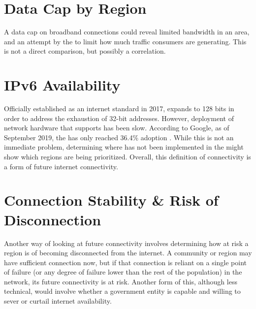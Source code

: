 \section{Data Cap by Region}

A data cap on broadband connections could reveal limited bandwidth in an area, and an attempt by the \isp to limit how much traffic consumers are generating. This is not a direct comparison, but possibly a correlation.

\section{IPv6 Availability}\label{sec:definition_ipv6}

Officially established as an internet standard in 2017, \ipvs expands \ipvf to 128 bits in order to address the exhaustion of 32-bit \ipvf addresses. However, deployment of network hardware that supports \ipvs has been slow. According to Google, as of September 2019, the \us has only reached 36.4\% \ipvs adoption \cite{Google2019a}. While this is not an immediate problem, determining where \ipvs has not been implemented in the \us might show which regions are being prioritized. Overall, this definition of connectivity is a form of future internet connectivity.

\section{Connection Stability \& Risk of Disconnection}
Another way of looking at future connectivity involves determining how at risk a region is of becoming disconnected from the internet. A community or region may have sufficient connection now, but if that connection is reliant on a single point of failure (or any degree of failure lower than the rest of the population) in the network, its future connectivity is at risk. Another form of this, although less technical, would involve whether a government entity is capable and willing to sever or curtail internet availability.